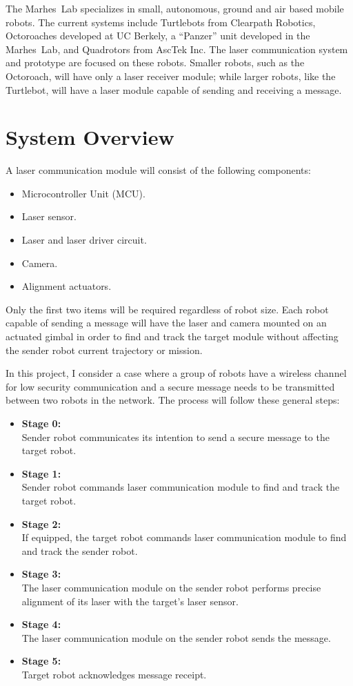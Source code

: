 \documentclass[botnum, fleqn]{unmeethesis}
\def \marhes{{\sc Marhes~}}
\begin{document}
The  \marhes Lab specializes in small, autonomous, ground and air based mobile robots. The current systems include Turtlebots from Clearpath Robotics, Octoroaches developed at UC Berkely, a “Panzer” unit developed in the \marhes Lab, and Quadrotors from AscTek Inc. The laser communication system and prototype are focused on these robots. Smaller robots, such as the Octoroach, will have only a laser receiver module; while larger robots, like the Turtlebot, will have a laser module capable of sending and receiving a message.
\clearpage

\section*{System Overview}

A laser communication module will consist of the following components:

\begin{itemize}
 \item Microcontroller Unit (MCU).
 \item Laser sensor.
 \item Laser and laser driver circuit.
 \item Camera.
 \item Alignment actuators.
\end{itemize}

Only the first two items will be required regardless of robot size. Each robot capable of sending a message will have the laser and camera mounted on an actuated gimbal in order to find and track the target module without affecting the sender robot current trajectory or mission.

In this project, I consider a case where a group of robots have a wireless channel for low security communication and a secure message needs to be transmitted between two robots in the network. The process will follow these general steps:

\begin{itemize}
 \item \textbf{Stage 0:}\\ Sender robot communicates its intention to send a secure message to the target robot.
 \item \textbf{Stage 1:}\\ Sender robot commands laser communication module to find and track the target robot.
 \item \textbf{Stage 2:}\\ If equipped, the target robot commands laser communication module to find and track the sender robot.
 \item \textbf{Stage 3:}\\ The laser communication module on the sender robot performs precise alignment of its laser with the target's laser sensor.
 \item \textbf{Stage 4:}\\ The laser communication module on the sender robot sends the message.
 \item \textbf{Stage 5:}\\ Target robot acknowledges message receipt.
\end{itemize}
\end{document}

